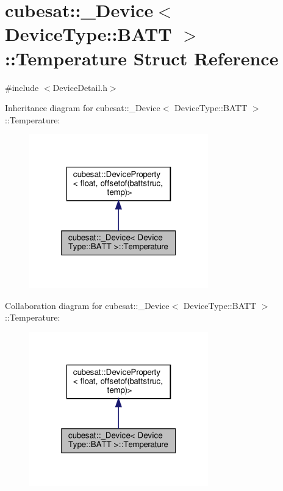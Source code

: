 \hypertarget{structcubesat_1_1__Device_3_01DeviceType_1_1BATT_01_4_1_1Temperature}{}\section{cubesat\+:\+:\+\_\+\+Device$<$ Device\+Type\+:\+:B\+A\+TT $>$\+:\+:Temperature Struct Reference}
\label{structcubesat_1_1__Device_3_01DeviceType_1_1BATT_01_4_1_1Temperature}


{\ttfamily \#include $<$Device\+Detail.\+h$>$}



Inheritance diagram for cubesat\+:\+:\+\_\+\+Device$<$ Device\+Type\+:\+:B\+A\+TT $>$\+:\+:Temperature\+:\nopagebreak
\begin{figure}[H]
\begin{center}
\leavevmode
\includegraphics[width=220pt]{structcubesat_1_1__Device_3_01DeviceType_1_1BATT_01_4_1_1Temperature__inherit__graph}
\end{center}
\end{figure}


Collaboration diagram for cubesat\+:\+:\+\_\+\+Device$<$ Device\+Type\+:\+:B\+A\+TT $>$\+:\+:Temperature\+:\nopagebreak
\begin{figure}[H]
\begin{center}
\leavevmode
\includegraphics[width=220pt]{structcubesat_1_1__Device_3_01DeviceType_1_1BATT_01_4_1_1Temperature__coll__graph}
\end{center}
\end{figure}
